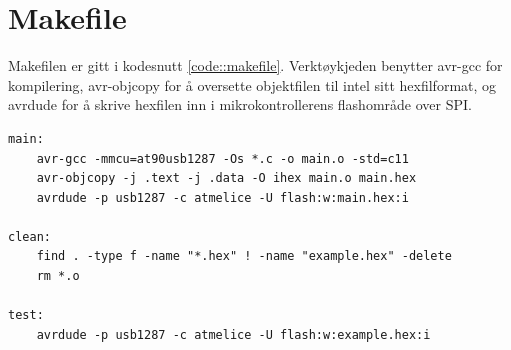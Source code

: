 \documentclass[11pt,a4paper]{article}
\begin{document}
\section{Makefile}
\label{app::makefile}
Makefilen er gitt i kodesnutt \ref{code::makefile}. Verktøykjeden benytter avr-gcc for kompilering, avr-objcopy for å oversette objektfilen til intel sitt hexfilformat, og avrdude for å skrive hexfilen inn i mikrokontrollerens flashområde over SPI.
\begin{lstlisting}[caption=Makefile.,label=code::makefile,breaklines=true]
main:
	avr-gcc -mmcu=at90usb1287 -Os *.c -o main.o -std=c11
	avr-objcopy -j .text -j .data -O ihex main.o main.hex
	avrdude -p usb1287 -c atmelice -U flash:w:main.hex:i

clean:
	find . -type f -name "*.hex" ! -name "example.hex" -delete
	rm *.o

test:
	avrdude -p usb1287 -c atmelice -U flash:w:example.hex:i
\end{lstlisting}
\end{document}
